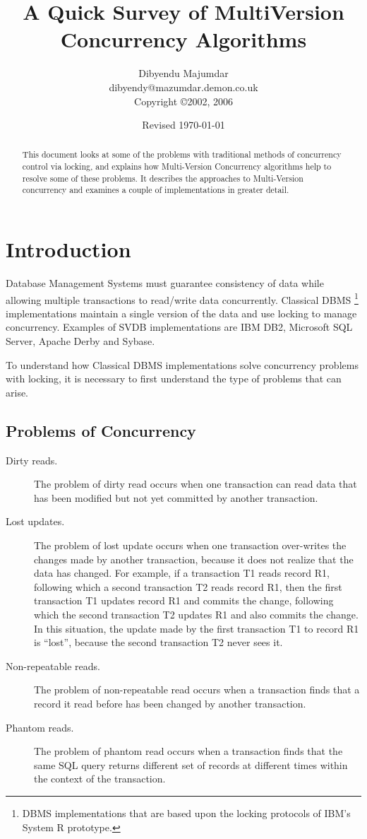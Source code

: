 \documentclass{article}
\title{A Quick Survey of MultiVersion Concurrency Algorithms}
\author{Dibyendu Majumdar \\
dibyendy@mazumdar.demon.co.uk \\
Copyright \copyright 2002, 2006}
\date{Revised \today}
\begin{document}
\maketitle

\begin{abstract}
This document looks at some of the problems with traditional methods
of concurrency control via locking, and explains how Multi-Version
Concurrency algorithms help to resolve some of these problems. It
describes the approaches to Multi-Version concurrency and examines a
couple of implementations in greater detail.
\end{abstract}

\section{Introduction}
Database Management Systems must guarantee consistency of data while
allowing multiple transactions to read/write data concurrently.
Classical DBMS \footnote{DBMS implementations that are based upon
the locking protocols of IBM's System R prototype.} implementations
maintain a single version of the data and use locking to manage
concurrency. Examples of SVDB implementations are IBM DB2, Microsoft 
SQL Server, Apache Derby and Sybase.

To understand how Classical DBMS implementations solve concurrency
problems with locking, it is necessary to first understand the type
of problems that can arise.

\subsection{Problems of Concurrency}
\begin{description}
\item[Dirty reads.] The problem of dirty read occurs when one transaction can
read data that has been modified but not yet committed by another
transaction.
\item[Lost updates.] The problem of lost update occurs when one transaction
over-writes the changes made by another transaction, because it does
not realize that the data has changed. For example, if a transaction
T1 reads record R1, following which a second transaction T2 reads
record R1, then the first transaction T1 updates record R1 and
commits the change, following which the second transaction T2
updates R1 and also commits the change. In this situation, the
update made by the first transaction T1 to record R1 is ``lost'',
because the second transaction T2 never sees it.
\item[Non-repeatable reads.] The problem of non-repeatable read occurs when a
transaction finds that a record it read before has been changed by
another transaction.
\item[Phantom reads.] The problem of phantom read occurs when a transaction finds
that the same SQL query returns different set of records at
different times within the context of the transaction.
\end{description}
\end{document}
